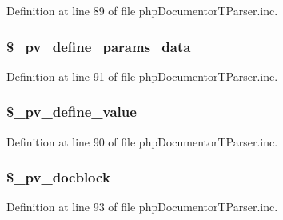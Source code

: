 \-Definition at line 89 of file php\-Documentor\-T\-Parser.\-inc.

\hypertarget{classphp_documentor_t_parser_aef5256ea3b0218efed02e3ecdd111521}{
\subsubsection[{\$\-\_\-pv\-\_\-define\-\_\-params\-\_\-data}]{\setlength{\rightskip}{0pt plus 5cm}\$\-\_\-pv\-\_\-define\-\_\-params\-\_\-data}}\label{classphp_documentor_t_parser_aef5256ea3b0218efed02e3ecdd111521}


\-Definition at line 91 of file php\-Documentor\-T\-Parser.\-inc.

\hypertarget{classphp_documentor_t_parser_a620284a43c42bbdf10b0060e3902fd08}{
\subsubsection[{\$\-\_\-pv\-\_\-define\-\_\-value}]{\setlength{\rightskip}{0pt plus 5cm}\$\-\_\-pv\-\_\-define\-\_\-value}}\label{classphp_documentor_t_parser_a620284a43c42bbdf10b0060e3902fd08}


\-Definition at line 90 of file php\-Documentor\-T\-Parser.\-inc.

\hypertarget{classphp_documentor_t_parser_a9e4c6cec7cb6a131aa1d64680caf2afa}{
\subsubsection[{\$\-\_\-pv\-\_\-docblock}]{\setlength{\rightskip}{0pt plus 5cm}\$\-\_\-pv\-\_\-docblock}}\label{classphp_documentor_t_parser_a9e4c6cec7cb6a131aa1d64680caf2afa}


\-Definition at line 93 of file php\-Documentor\-T\-Parser.\-inc.

